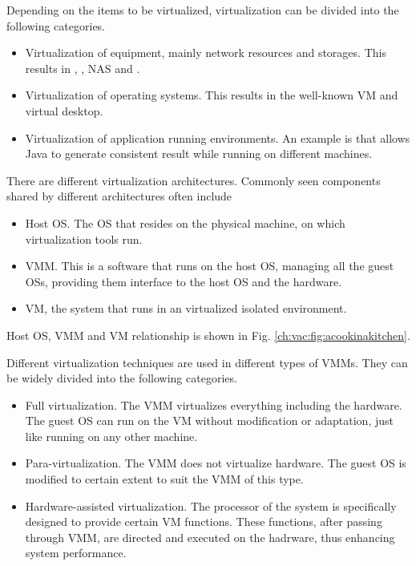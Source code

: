 Depending on the items to be virtualized, virtualization can be divided into the following categories.
\begin{itemize}
  \item Virtualization of equipment, mainly network resources and storages. This results in , , NAS and .
  \item Virtualization of operating systems. This results in the well-known VM and virtual desktop.
  \item Virtualization of application running environments. An example is  that allows Java to generate consistent result while running on different machines.
\end{itemize}

There are different virtualization architectures. Commonly seen components shared by different architectures often include
\begin{itemize}
	\item Host OS. The OS that resides on the physical machine, on which virtualization tools run.
	\item VMM. This is a software that runs on the host OS, managing all the guest OSs, providing them interface to the host OS and the hardware.
	\item VM, the system that runs in an virtualized isolated environment.
\end{itemize}
Host OS, VMM and VM relationship is shown in Fig. \ref{ch:vac:fig:acookinakitchen}.

Different virtualization techniques are used in different types of VMMs. They can be widely divided into the following categories.
\begin{itemize}
	\item Full virtualization. The VMM virtualizes everything including the hardware. The guest OS can run on the VM without modification or adaptation, just like running on any other machine.
	\item Para-virtualization. The VMM does not virtualize hardware. The guest OS is modified to certain extent to suit the VMM of this type.
	\item Hardware-assisted virtualization. The processor of the system is specifically designed to provide certain VM functions. These functions, after passing through VMM, are directed and executed on the hadrware, thus enhancing system performance.
\end{itemize}

